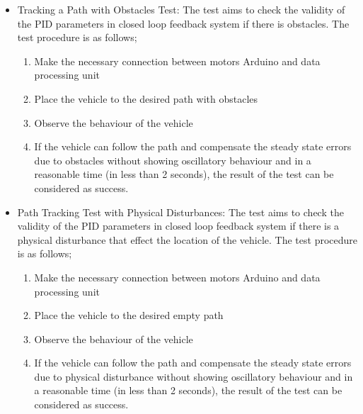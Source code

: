 \documentclass[a4paper,12pt]{article}
\begin{document}
\begin{itemize}
			
		\item Tracking a Path with Obstacles Test:
			The test aims to check the validity of the PID parameters in closed loop feedback system if there is obstacles. The test procedure is as follows; 		
			\begin{enumerate}
				\item Make the necessary connection between motors Arduino and data processing unit \vspace{-0.2cm}
				\item Place the vehicle to the desired path with obstacles \vspace{-0.2cm}
				\item Observe the behaviour of the vehicle \vspace{-0.2cm}
				\item If the vehicle can follow the path and compensate the steady state errors due to obstacles without showing oscillatory behaviour and in a reasonable time (in less than 2 seconds), the result of the test can be considered as success. \vspace{-0.2cm}
			\end{enumerate}
				
		
		\item Path Tracking Test with Physical Disturbances:
			The test aims to check the validity of the PID parameters in closed loop feedback system if there is a physical disturbance that effect the location of the vehicle. The test procedure is as follows; 		
			\begin{enumerate}
				\item Make the necessary connection between motors Arduino and data processing unit \vspace{-0.2cm}
				\item Place the vehicle to the desired empty path  \vspace{-0.2cm}
				\item Observe the behaviour of the vehicle \vspace{-0.2cm}
				\item If the vehicle can follow the path and compensate the steady state errors due to physical disturbance without showing oscillatory behaviour and in a reasonable time (in less than 2 seconds), the result of the test can be considered as success. \vspace{-0.2cm}
			\end{enumerate}
		
		\end{itemize}
	
\end{document}
